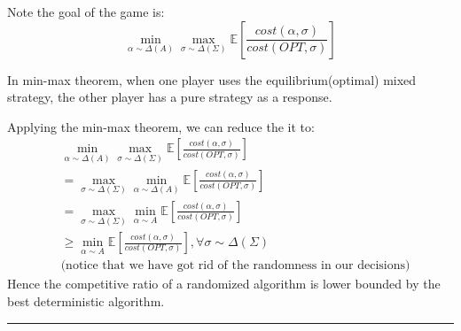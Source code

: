 \documentclass[11pt]{article}
\newenvironment{proof}{{\bf Proof:  }}{\hfill\rule{2mm}{2mm}}
\begin{document}
\begin{proof}
	Note the goal of the game is:
	$$
	\min_{\alpha \sim \Delta(A)}\max_{\sigma \sim \Delta(\Sigma)}\mathbb{E}\left[\frac{cost(\alpha, \sigma)}{cost(OPT, \sigma)}\right]
	$$
	
	In min-max theorem, when one player uses the equilibrium(optimal) mixed strategy, the other player has a pure strategy as a response. 
	
	Applying the min-max theorem, we can reduce the it to:
	\begin{align*}
	&\min_{\alpha \sim \Delta(A)}\max_{\sigma \sim \Delta(\Sigma)}\mathbb{E}\left[\frac{cost(\alpha, \sigma)}{cost(OPT, \sigma)}\right] \\
	&=\max_{\sigma \sim \Delta(\Sigma)}\min_{\alpha \sim \Delta(A)}\mathbb{E}\left[\frac{cost(\alpha, \sigma)}{cost(OPT, \sigma)}\right]\\
	&=\max_{\sigma \sim \Delta(\Sigma)}\min_{\alpha \sim A}\mathbb{E}\left[\frac{cost(\alpha, \sigma)}{cost(OPT, \sigma)}\right] \\
	&\geq \min_{\alpha \sim A} \mathbb{E}\left[\frac{cost(\alpha, \sigma)}{cost(OPT, \sigma)}\right], \forall \sigma \sim \Delta(\Sigma) \\
	&\text{(notice that we have got rid of the randomness in our decisions)}
	\end{align*}
	Hence the competitive ratio of a randomized algorithm is lower bounded by the best deterministic algorithm.
\end{proof} 
\end{document}
